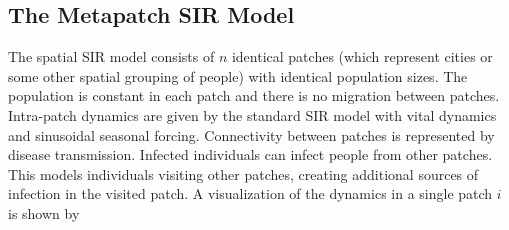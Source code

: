 \documentclass[twocolumn,nofootinbib,showkeys,twoside,floatfix,unsortedaddress,flushbottom,10pt,aps,pra]{report}
\begin{document}
\subsection{The Metapatch SIR Model} 
The spatial SIR model consists of $n$ identical patches (which represent cities or some other spatial grouping of people) with identical population sizes. The population is constant in each patch and there is no migration between patches. Intra-patch dynamics are given by the standard SIR model with vital dynamics and sinusoidal seasonal forcing. Connectivity between patches is represented by disease transmission. Infected individuals can infect people from other patches. This models individuals visiting other patches, creating additional sources of infection in the visited patch. 
A visualization of the dynamics in a single patch $i$ is shown by
\begin{center}
\end{center}
\end{document}
